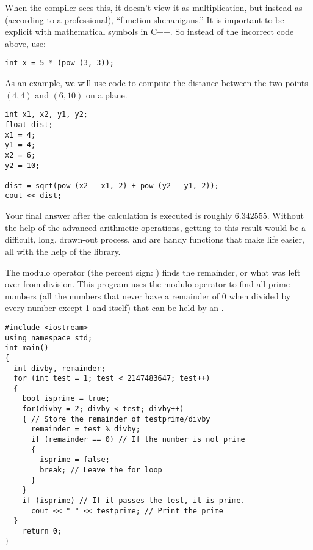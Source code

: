 When the compiler sees this, it doesn't view it as multiplication, but instead as (according to a professional), ``function shenanigans.'' 
It is important to be explicit with mathematical symbols in C++. 
So instead of the incorrect code above, use:

\noindent\begin{minipage}{\linewidth}\begin{lstlisting}
int x = 5 * (pow (3, 3));
\end{lstlisting}\end{minipage}

As an example, we will use code to compute the distance between the two points $(4,4)$ and $(6, 10)$ on a plane.

\noindent\begin{minipage}{\linewidth}\begin{lstlisting}
int x1, x2, y1, y2;
float dist;
x1 = 4;
y1 = 4;
x2 = 6;
y2 = 10;

dist = sqrt(pow (x2 - x1, 2) + pow (y2 - y1, 2));
cout << dist;
\end{lstlisting}\end{minipage}
	
	Your final answer after the calculation is executed is roughly $6.342555$. 
	Without the help of the advanced arithmetic operations, getting to this result would be a difficult, long, drawn-out process. 
	 and  are handy functions that make life easier, all with the help of the  library.

The modulo operator (the percent sign: \Code{\%}) finds the remainder, or what was left over from division. 
This program uses the modulo operator to find all prime numbers (all the numbers that never have a remainder of 0 when divided by every number except 1 and itself) that can be held by an .

\noindent\begin{minipage}{\linewidth}\begin{lstlisting}
#include <iostream>
using namespace std;
int main()
{
  int divby, remainder;
  for (int test = 1; test < 2147483647; test++)
  {
    bool isprime = true;
    for(divby = 2; divby < test; divby++)
    { // Store the remainder of testprime/divby
      remainder = test % divby; 
      if (remainder == 0) // If the number is not prime
      {
        isprime = false;
        break; // Leave the for loop
      }
    }
    if (isprime) // If it passes the test, it is prime.
      cout << " " << testprime; // Print the prime
  }
	return 0;
}
\end{lstlisting}\end{minipage}

